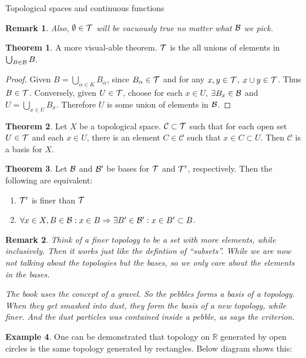 \documentclass{report}
\newtheorem*{remark}{Remark}
\theoremstyle{definition}
\newtheorem{theorem}{Theorem}[chapter]
\newtheorem{example}[theorem]{Example}
\newcommand{\RA}{\ensuremath\Rightarrow}
\newcommand{\RR}{\mathbb{R}}
\newcommand{\ex}{\ensuremath\exists}
\begin{document}
\begin{chapter}{Topological spaces and continuous functions}
\begin{remark}
    Also, $\emptyset\in\mathcal{T}$ will be vacuously true no matter what $\mathcal{B}$
    we pick.
  \end{remark}
  \begin{theorem}
    A more visual-able theorem. $\mathcal{T}$ is the all unions of elements in
    $\bigcup_{B\in\mathcal{B}} B$.
  \end{theorem}
  \begin{proof}
    Given $B=\bigcup_{\alpha\in K} B_\alpha$, since $B_\alpha\in\mathcal{T}$
    and for any $x,y\in\mathcal{T}$, $x\cup y\in\mathcal{T}$. Thus $B\in\mathcal{T}$. Conversely,
    given $U\in\mathcal{T}$, choose for each $x\in U$, $\ex B_x\in\B$ and
    $U=\bigcup_{x\in U} B_x$. Therefore $U$ is some union of elements
    in $\mathcal{B}$.
  \end{proof}
  \begin{theorem}
    Let $X$ be a topological space. $\mathcal{C}\subset \mathcal{T}$ such that
    for each open set $U\in\mathcal{T}$ and each $x\in U$, there is an element
    $C\in\mathcal{C}$ such that $x\in C\subset U$. Then $\mathcal{C}$
    is a basis for $X$.
  \end{theorem}
  \begin{theorem}
    Let $\mathcal{B}$ and $\mathcal{B}'$ be bases for $\mathcal{T}$ and $\mathcal{T}'$, respectively. Then
    the following are equivalent:
    \begin{enumerate}
    \item $\mathcal{T}'$ is finer than $\mathcal{T}$
    \item
      $\forall x\in X, B\in\B : x\in B \RA \exists B'\in\B' : x\in B'
      \subset B$.
    \end{enumerate}
  \end{theorem}
  \begin{remark}
    Think of a finer topology to be a set with more elements, while
    inclusively. Then it works just like the defintion of
    ``subsets''. While we are now not talking about the topologies but
    the bases, so we only care about the elements in the bases.

    The book uses the concept of a gravel. So the pebbles forms a
    basis of a topology. When they get smashed into dust, they form
    the basis of a new topology, while finer. And the dust particles
    was contained inside a pebble, as says the criterion.
  \end{remark}
  \begin{example}
    One can be demonstrated that topology on $\RR$ generated by open
    circles is the same topology generated by rectangles. Below
    diagram shows this:

    \begin{figure}[H]
      \centering
\end{figure}
\end{example}
\end{chapter}
\end{document}
